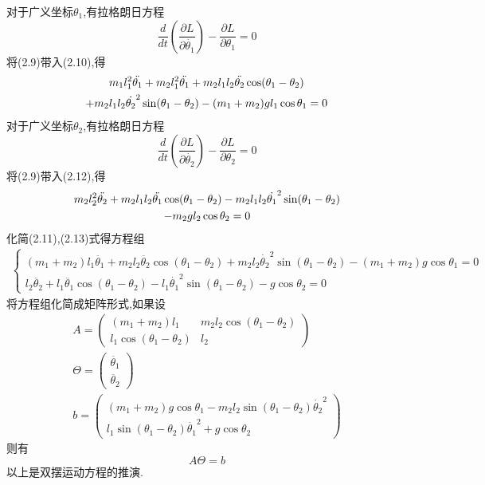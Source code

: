\documentclass{report}
\begin{document}
对于广义坐标$\theta_1$,有拉格朗日方程
\begin{equation}
    \frac{d}{dt}(\frac{\partial L}{\partial\dot{\theta_1}})-\frac{\partial L}{\partial \theta_1}=0
\end{equation}
将(2.9)带入(2.10),得
\begin{gather}
    m_1l_1^2\ddot{\theta_1}+m_2l_1^2\ddot{\theta_1}+m_2l_1l_2\ddot{\theta_2}\cos(\theta_1-\theta_2)\notag \\+m_2l_1l_2\dot{\theta_2}^2\sin(\theta_1-\theta_2)-(m_1+m_2)gl_1\cos\theta_1=0
\end{gather}
对于广义坐标$\theta_2$,有拉格朗日方程
\begin{equation}
    \frac{d}{dt}(\frac{\partial L}{\partial\dot{\theta_2}})-\frac{\partial L}{\partial \theta_2}=0
\end{equation}
将(2.9)带入(2.12),得
\begin{gather}
    m_2l_2^2\ddot{\theta_2}+m_2l_1l_2\ddot{\theta_1}\cos(\theta_1-\theta_2)-m_2l_1l_2\dot{\theta_1}^2\sin(\theta_1-\theta_2) \notag \\
    -m_2gl_2\cos\theta_2=0
\end{gather}
化简(2.11),(2.13)式得方程组
\begin{gather}
    \begin{cases}
        (m_1+m_2)l_1\ddot{\theta_1}+m_2l_2\ddot{\theta_2}\cos(\theta_1-\theta_2)+m_2l_2\dot{\theta_2}^2\sin(\theta_1-\theta_2)-(m_1+m_2)g\cos\theta_1=0  \\
        l_2\ddot{\theta_2}+l_1\ddot{\theta_1}\cos(\theta_1-\theta_2)-l_1\dot{\theta_1}^2\sin(\theta_1-\theta_2)-g\cos\theta_2=0
    \end{cases}
\end{gather}
将方程组化简成矩阵形式,如果设
\begin{gather}
A=\begin{pmatrix}
    (m_1+m_2)l_1 & m_2l_2\cos(\theta_1-\theta_2) \\
    l_1\cos(\theta_1-\theta_2) & l_2
\end{pmatrix}  \\
\Theta=\begin{pmatrix}
    \ddot{\theta_1} \\
    \ddot{\theta_2}
\end{pmatrix} \\
b=\begin{pmatrix}
    (m_1+m_2)g\cos\theta_1-m_2l_2\sin(\theta_1-\theta_2)\dot{\theta_2}^2 \\
    l_1\sin(\theta_1-\theta_2)\dot{\theta_1}^2+g\cos{\theta_2}
\end{pmatrix}
\end{gather}
则有
\begin{equation}
A\Theta=b
\end{equation}
以上是双摆运动方程的推演.
\end{document}
